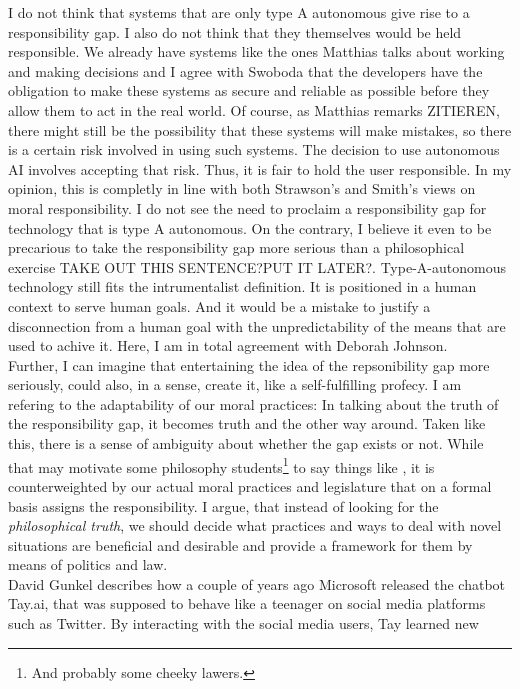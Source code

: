 \documentclass{article}
\begin{document}
I do not think that systems that are only type A autonomous give rise to a
responsibility gap. I also do not think that they themselves would be held
responsible. We already have systems like the ones Matthias talks about working
and making decisions and I agree with Swoboda that the developers have the
obligation to make these systems as secure and reliable as possible before they
allow them to act in the real world. Of course, as Matthias remarks ZITIEREN, there might
still be the possibility that these systems will make mistakes, so there is a
certain risk involved in using such systems. The decision to use autonomous AI
involves accepting that risk. Thus, it is fair to hold the user responsible. In
my opinion, this is completly in line with both Strawson's and Smith's views on
moral responsibility. I do not see the need to proclaim a responsibility gap for
technology that is type A autonomous. On the contrary, I believe it even to be
precarious to take the responsibility gap more serious than a philosophical
exercise TAKE OUT THIS SENTENCE?PUT IT LATER?. Type-A-autonomous technology still fits the intrumentalist definition.
It is positioned in a human context to serve human goals. And it would be a
mistake to justify a disconnection from a human goal with the unpredictability
of the means that are used to achive it. Here, I am in total agreement with
Deborah Johnson.\\
Further, I can imagine that entertaining the idea of the repsonibility gap more
seriously, could also, in a sense, create it, like a self-fulfilling profecy. I
am refering to the adaptability of our moral practices: In talking about the
truth of the responsibility gap, it becomes truth and the other way around.
Taken like this, there is a sense of ambiguity about whether the gap exists or
not. While that may motivate some philosophy students\footnote{And probably some
	cheeky lawers.} to say things like , it is counterweighted by
our actual moral practices and legislature that on a formal basis assigns the
responsibility. I argue, that instead of looking for
the \textit{philosophical truth}, we should decide what practices and ways to
deal with novel situations are beneficial and desirable and provide a framework
for them by means of politics and law.\\
David Gunkel describes how a couple of years ago Microsoft released the chatbot
Tay.ai, that was supposed to behave like a teenager on social media platforms
such as Twitter. By interacting with the social media users, Tay learned new
\end{document}
